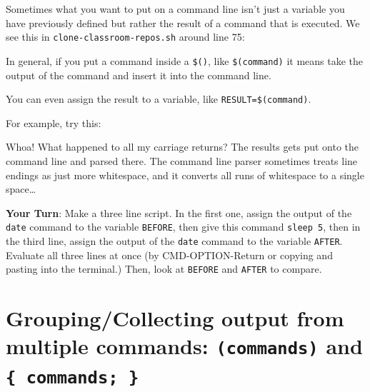 \documentclass[]{krantz}
\makeatletter
\newenvironment{Shaded}{\begin{snugshade}}{\end{snugshade}}
\newcommand{\BuiltInTok}[1]{#1}
\newcommand{\CommentTok}[1]{\textcolor[rgb]{0.37,0.37,0.37}{\textit{#1}}}
\newcommand{\FunctionTok}[1]{\textcolor[rgb]{0,0,0}{#1}}
\newcommand{\NormalTok}[1]{#1}
\newcommand{\StringTok}[1]{\textcolor[rgb]{0.5,0.5,0.5}{#1}}
\newcommand{\VariableTok}[1]{\textcolor[rgb]{0,0,0}{#1}}
\newenvironment{kframe}{%
\medskip{}
\setlength{\fboxsep}{.8em}
 \def\at@end@of@kframe{}%
 \ifinner\ifhmode%
  \def\at@end@of@kframe{\end{minipage}}%
  \begin{minipage}{\columnwidth}%
 \fi\fi%
 \def\FrameCommand##1{\hskip\@totalleftmargin \hskip-\fboxsep
 \colorbox{shadecolor}{##1}\hskip-\fboxsep
     \hskip-\linewidth \hskip-\@totalleftmargin \hskip\columnwidth}%
 \MakeFramed {\advance\hsize-\width
   \@totalleftmargin\z@ \linewidth\hsize
   \@setminipage}}%
 {\par\unskip\endMakeFramed%
 \at@end@of@kframe}
\renewenvironment{Shaded}{\begin{kframe}}{\end{kframe}}
\makeatother
\begin{document}
Sometimes what you want to put on a command line isn't just a variable
you have previously defined but rather the result of a command that
is executed. We see this in \texttt{clone-classroom-repos.sh} around line 75:

\begin{Shaded}
\end{Shaded}

In general, if you put a command inside a \texttt{\$()}, like \texttt{\$(command)} it means take the output of
the command and insert it into the command line.

You can even assign the result to a variable, like \texttt{RESULT=\$(command)}.

For example, try this:

\begin{Shaded}
\end{Shaded}

Whoa! What happened to all my carriage returns? The results gets put onto the command line and
parsed there. The command line parser sometimes treats line endings as just more whitespace,
and it converts all runs of whitespace to a single space\ldots{}

\textbf{Your Turn}: Make a three line script. In the first one, assign the output
of the \texttt{date} command to the variable \texttt{BEFORE}, then give this command \texttt{sleep\ 5},
then in the third line, assign the output of the \texttt{date} command to the variable
\texttt{AFTER}. Evaluate all three lines at once (by CMD-OPTION-Return or copying and pasting
into the terminal.) Then, look at \texttt{BEFORE} and \texttt{AFTER} to compare.

\hypertarget{groupingcollecting-output-from-multiple-commands-commands-and-commands}{%
\section{\texorpdfstring{Grouping/Collecting output from multiple commands: \texttt{(commands)} and \texttt{\{\ commands;\ \}}}{Grouping/Collecting output from multiple commands: (commands) and \{ commands; \}}}\label{groupingcollecting-output-from-multiple-commands-commands-and-commands}}
\end{document}
